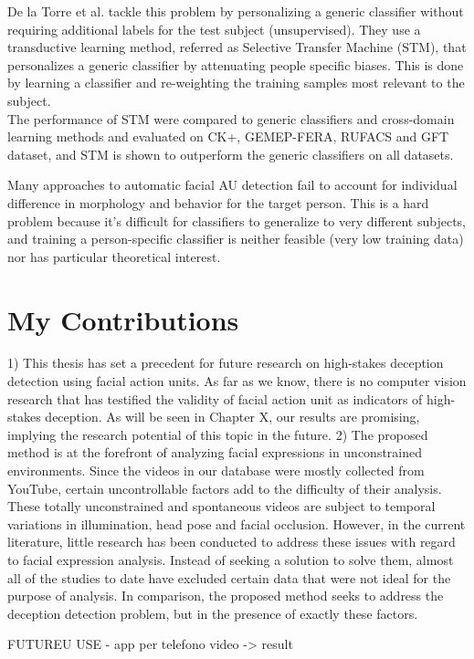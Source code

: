 De la Torre et al. \cite{AU_STM} \cite{AU_STM2} tackle this problem by personalizing a generic classifier without requiring additional labels for the test subject (unsupervised). They use a transductive learning method, referred as Selective Transfer Machine (STM), that personalizes a generic classifier by attenuating people specific biases. This is done by  learning a classifier and re-weighting the training samples most relevant to the subject. \\
The performance of STM were compared to generic classifiers and cross-domain learning methods and evaluated on CK+, GEMEP-FERA, RUFACS and GFT dataset, and STM is shown to outperform the generic classifiers on all datasets.

Many approaches to automatic facial AU detection fail to account for individual difference in morphology and behavior for the target person. This is a hard problem because it's difficult for classifiers to generalize to very different subjects, and training a person-specific classifier is neither feasible (very low training data) nor has particular theoretical interest. 

\pagebreak
\section{My Contributions} \label{contrib}
1) This thesis has set a precedent for future research on high-stakes deception detection using facial action units. As far as we know, there is no computer vision research that has testified the validity of facial action unit as indicators of high-stakes deception. As will be seen in Chapter X, our results are promising, implying the research potential of this topic in the future.
2) The proposed method is at the forefront of analyzing facial expressions in unconstrained environments. Since the videos in our database were mostly collected from YouTube, certain uncontrollable factors add to the difficulty of their analysis. \\
These totally unconstrained and spontaneous videos are subject to temporal variations in illumination, head pose and facial occlusion. However, in the current literature, little research has been conducted to address these issues with regard to facial expression analysis. Instead of seeking a solution to solve them, almost all of the studies to date have excluded certain data that were not ideal for the purpose of analysis. In comparison, the proposed method seeks to address the deception detection problem, but in the presence of exactly these factors.

FUTUREU USE - app per telefono video -> result

\pagebreak